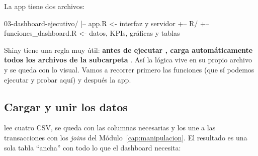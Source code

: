La app tiene dos archivos:

\begin{textocodigo}
03-dashboard-ejecutivo/
|-- app.R                      <- interfaz y servidor
+-- R/
    +-- funciones_dashboard.R  <- datos, KPIs, gráficas y tablas
\end{textocodigo}

Shiny tiene una regla muy útil: \textbf{antes de ejecutar ,
carga automáticamente todos los archivos  de la subcarpeta
}. Así la lógica vive en su propio archivo y  se
queda con lo visual. Vamos a recorrer primero las funciones (que sí podemos
ejecutar y probar aquí) y después la app.

\subsection{Cargar y unir los datos}

 lee cuatro CSV, se queda con las
columnas necesarias y los une a las transacciones con los \emph{joins} del
Módulo~\ref{cap:manipulacion}. El resultado es una sola tabla ``ancha'' con
todo lo que el dashboard necesita:

